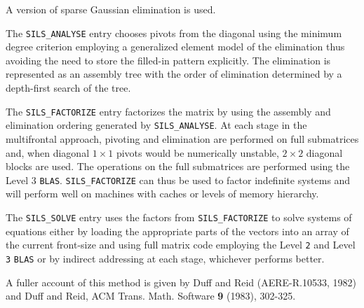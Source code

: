 \documentclass{galahad}
\newcommand{\packagename}{SILS}
\begin{document}

\galmethod
A version of sparse Gaussian elimination is used. 
 

The {\tt \packagename\_ANALYSE} entry chooses pivots from the 
 diagonal using the minimum degree criterion employing a 
 generalized element model of the elimination thus avoiding the 
 need to store the filled-in pattern explicitly.  The 
 elimination is represented as an assembly tree 
 with the order of elimination determined by a depth-first 
 search of the tree. 
 

The {\tt \packagename\_FACTORIZE} entry factorizes the matrix by using the 
 assembly and elimination ordering generated by {\tt \packagename\_ANALYSE}.  At 
 each stage in the multifrontal approach, pivoting and 
 elimination are performed on full submatrices and, when 
 diagonal $1 \times 1$ pivots would be numerically unstable, $2 \times 2$ 
 diagonal blocks are used.  The operations on the full submatrices 
 are performed using the Level 3 {\tt BLAS}.  {\tt \packagename\_FACTORIZE} 
 can thus be  used to 
 factor indefinite systems and will perform well on machines 
 with caches or levels of memory hierarchy. 
 

The {\tt \packagename\_SOLVE} entry uses the factors from 
{\tt \packagename\_FACTORIZE} to solve 
 systems of equations either by loading the appropriate parts of 
 the vectors into an  array  of the current front-size and 
 using full matrix code employing the Level {\tt 2} and Level {\tt 3} 
{\tt BLAS} 
 or by indirect addressing at each stage, 
 whichever performs better. 
 

\galreference
A fuller account of this method is given by Duff and Reid 
(AERE-R.10533, 1982) and Duff and Reid, ACM Trans. Math. 
Software {\bf 9} (1983), 302-325. 
 

\end{document}
